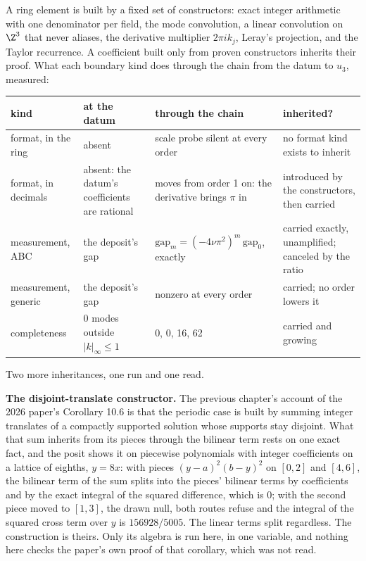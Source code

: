 A ring element is built by a fixed set of constructors: exact integer arithmetic with one
denominator per field, the mode convolution, a linear convolution on $\Z^3$ that never aliases, the
derivative multiplier $2\pi i k_j$, Leray's projection, and the Taylor recurrence. A coefficient
built only from proven constructors inherits their proof. What each boundary kind does through the
chain from the datum to $u_3$, measured:

\begin{center}
\begin{tabular}{@{}p{}p{}p{}p{}@{}}
\toprule
kind & at the datum & through the chain & inherited? \\
\midrule
format, in the ring & absent & scale probe silent at every order & no format kind exists to inherit \\[0.4em]
format, in decimals & absent: the datum's coefficients are rational & moves from order 1 on: the derivative brings $\pi$ in & introduced by the constructors, then carried \\[0.4em]
measurement, ABC & the deposit's gap & $\mathrm{gap}_m = (-4\nu\pi^2)^m\,\mathrm{gap}_0$, exactly & carried exactly, unamplified; canceled by the ratio \\[0.4em]
measurement, generic & the deposit's gap & nonzero at every order & carried; no order lowers it \\[0.4em]
completeness & 0 modes outside $|k|_\infty\le1$ & 0, 0, 16, 62 & carried and growing \\
\bottomrule
\end{tabular}
\end{center}

Two more inheritances, one run and one read.

\textbf{The disjoint-translate constructor.} The previous chapter's account of the 2026 paper's
Corollary 10.6 is that the periodic case is built by summing integer translates of a compactly
supported solution whose supports stay disjoint. What that sum inherits from its pieces through the
bilinear term rests on one exact fact, and the posit shows it on piecewise polynomials with integer
coefficients on a lattice of eighths, $y = 8x$: with pieces $(y-a)^2(b-y)^2$ on $[0,2]$ and $[4,6]$,
the bilinear term of the sum splits into the pieces' bilinear terms by coefficients and by the exact
integral of the squared difference, which is $0$; with the second piece moved to $[1,3]$, the drawn
null, both routes refuse and the integral of the squared cross term over $y$ is $156928/5005$. The
linear terms split regardless. The construction is theirs. Only its algebra is run here, in one
variable, and nothing here checks the paper's own proof of that corollary, which was not read.

